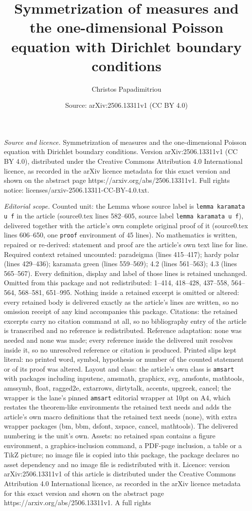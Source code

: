 \documentclass[10pt,a4paper]{amsart}
\title[Symmetrization of measures and the one-dimensional Poisson e]{Symmetrization of measures and the one-dimensional Poisson equation with Dirichlet boundary conditions}
\author{Christos Papadimitriou}
\date{Source: arXiv:2506.13311v1 (CC BY 4.0)}
\begin{document}
\maketitle

\noindent\emph{Source and licence.} Symmetrization of measures and the one-dimensional Poisson equation with Dirichlet boundary conditions. Version arXiv:2506.13311v1 (CC BY 4.0), distributed under the Creative Commons Attribution 4.0 International licence, as recorded in the arXiv licence metadata for this exact version and shown on the abstract page https://arxiv.org/abs/2506.13311v1. Full rights notice: licenses/arxiv-2506.13311-CC-BY-4.0.txt.\par\smallskip

\noindent\textit{Editorial scope.} Counted unit: the Lemma whose source label is \texttt{lemma karamata u f} in the article (source0.tex lines 582--605, source label \texttt{lemma karamata u f}), delivered together with the article's own complete original proof of it (source0.tex lines 606--650, one \texttt{proof} environment of 45 lines). No mathematics is written, repaired or re-derived: statement and proof are the article's own text line for line. Required context retained uncounted: paradeigma (lines 415--417); hardy polar (lines 429--436); karamata green (lines 559--569); 4.2 (lines 561--563); 4.3 (lines 565--567). Every definition, display and label of those lines is retained unchanged. Omitted from this package and not redistributed: 1--414, 418--428, 437--558, 564--564, 568--581, 651--995. Nothing inside a retained excerpt is omitted or altered: every retained body is delivered exactly as the article's lines are written, so no omission receipt of any kind accompanies this package. Citations: the retained excerpts carry no citation command at all, so no bibliography entry of the article is transcribed and no reference is redistributed. Reference adaptation: none was needed and none was made; every reference inside the delivered unit resolves inside it, so no unresolved reference or citation is produced. Printed slips kept literal: no printed word, symbol, hypothesis or number of the counted statement or of its proof was altered. Layout and class: the article's own class is \texttt{amsart} with packages including inputenc, amsmath, graphicx, svg, amsfonts, mathtools, amssymb, float, ragged2e, extarrows, dirtytalk, accents, upgreek, cancel; the wrapper is the lane's pinned \texttt{amsart} editorial wrapper at 10pt on A4, which restates the theorem-like environments the retained text needs and adds the article's own macro definitions that the retained text needs (none), with extra wrapper packages (bm, bbm, dsfont, xspace, cancel, mathtools). The delivered numbering is the unit's own. Assets: no retained span contains a figure environment, a graphics-inclusion command, a PDF-page inclusion, a table or a TikZ picture; no image file is copied into this package, the package declares no asset dependency and no image file is redistributed with it. Licence: version arXiv:2506.13311v1 of this article is distributed under the Creative Commons Attribution 4.0 International licence, as recorded in the arXiv licence metadata for this exact version and shown on the abstract page https://arxiv.org/abs/2506.13311v1. A full rights 
\end{document}
